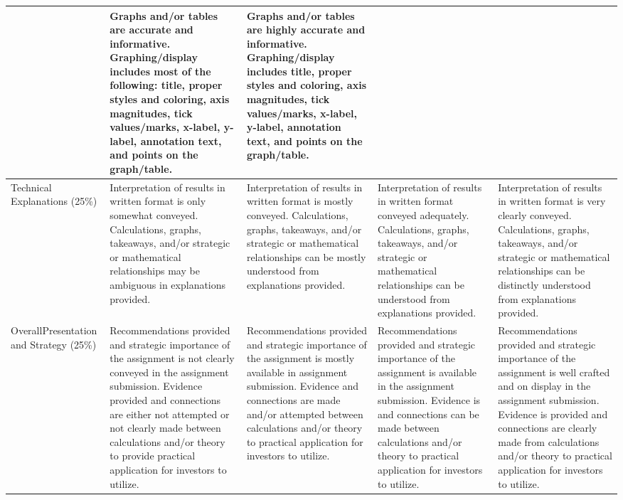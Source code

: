 \documentclass[letterpaper,12pt]{article}
\begin{document}
\begin{landscape}
\begin{footnotesize}
\begin{longtable}{| >{\RaggedRight}p{} | >{\RaggedRight}p{} | >{\RaggedRight}p{} | >{\RaggedRight}p{} | >{\RaggedRight}p{} |}
   & Graphs and/or tables are accurate and informative. Graphing/display includes most of the following: title, proper styles and coloring, axis magnitudes, tick values/marks, x-label, y-label, annotation text, and points on the graph/table. 
   & Graphs and/or tables are highly accurate and informative. Graphing/display includes title, proper styles and coloring, axis magnitudes, tick values/marks, x-label, y-label, annotation text, and points on the graph/table.
   \\\hline
Technical Explanations (25\%)       
   & Interpretation of results in written format is only somewhat conveyed. Calculations, graphs, takeaways, and/or strategic or mathematical relationships may be ambiguous in explanations provided. 
   & Interpretation of results in written format is mostly conveyed. Calculations, graphs, takeaways, and/or strategic or mathematical relationships can be mostly understood from explanations provided. 
   & Interpretation of results in written format conveyed adequately. Calculations, graphs, takeaways, and/or strategic or mathematical relationships can be understood from explanations provided. 
   & Interpretation of results in written format is very clearly conveyed.  Calculations, graphs, takeaways, and/or strategic or mathematical relationships can be distinctly understood from explanations provided.
   \\\hline
Overall\newline Presentation and Strategy (25\%) 
   & Recommendations provided and strategic importance of the assignment is not clearly conveyed in the assignment submission. Evidence provided and connections are either not attempted or not clearly made between calculations and/or theory to provide practical application for investors to utilize.
   & Recommendations provided and strategic importance of the assignment is mostly available in assignment submission. Evidence and connections are made and/or attempted between calculations and/or theory to practical application for investors to utilize. 
   & Recommendations provided and strategic importance of the assignment is available in the assignment submission. Evidence is and connections can be made between calculations and/or theory to practical application for investors to utilize. 
   & Recommendations provided and strategic importance of the assignment is well crafted and on display in the assignment submission.  Evidence is provided and connections are clearly made from calculations and/or theory to practical application for investors to utilize.
\\ \hline
\end{longtable}
\end{footnotesize}
\end{landscape}
\end{document}
